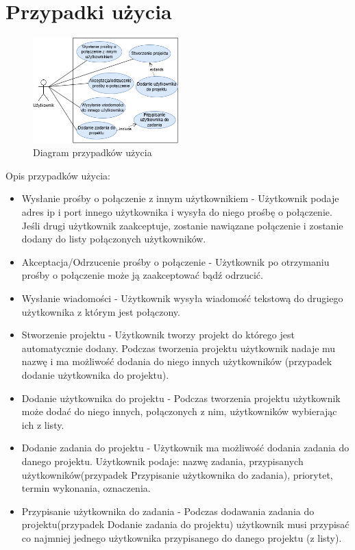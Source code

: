 \section{Przypadki użycia}
\begin{figure}[!ht]
	\centering
		\includegraphics[width=0.5\textwidth]{Images/PrzypadkiUzycia.png}
	\caption{Diagram przypadków użycia}
	\label{fig:PrzypadkiUzycia}
\end{figure}
Opis przypadków użycia:
\begin{itemize}
\item {Wysłanie prośby o połączenie z innym użytkownikiem} - Użytkownik podaje adres ip i port innego użytkownika i wysyła do niego prośbę o połączenie. Jeśli drugi użytkownik zaakceptuje, zostanie nawiązane połączenie i zostanie dodany do listy połączonych użytkowników.
\item {Akceptacja/Odrzucenie prośby o połączenie} - Użytkownik po otrzymaniu prośby o połączenie może ją zaakceptować bądź odrzucić.
\item {Wysłanie wiadomości} - Użytkownik wysyła wiadomość tekstową do drugiego użytkownika z którym jest połączony.
\item {Stworzenie projektu} - Użytkownik tworzy projekt do którego jest automatycznie dodany. Podczas tworzenia projektu użytkownik nadaje mu nazwę i ma możliwość dodania do niego innych użytkowników (przypadek dodanie użytkownika do projektu).
\item {Dodanie użytkownika do projektu} - Podczas tworzenia projektu użytkownik może dodać do niego innych, połączonych z nim, użytkowników wybierając ich z listy.
\item {Dodanie zadania do projektu} - Użytkownik ma możliwość dodania zadania do danego projektu. Użytkownik podaje: nazwę zadania, przypisanych użytkowników(przypadek Przypisanie użytkownika do zadania), priorytet, termin wykonania, oznaczenia.
\item {Przypisanie użytkownika do zadania} - Podczas dodawania zadania do projektu(przypadek Dodanie zadania do projektu) użytkownik musi przypisać co najmniej jednego użytkownika przypisanego do danego projektu (z listy).
\end{itemize}

